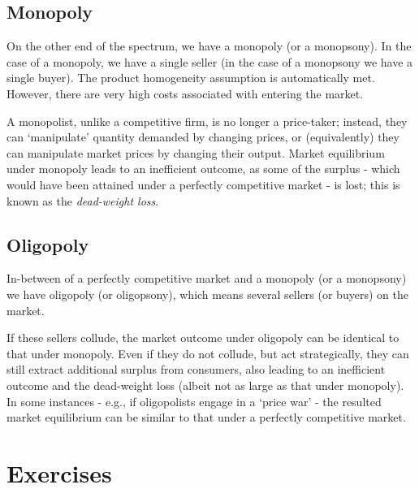 \documentclass[
  oneside]{book}
\begin{document}
\hypertarget{monopoly}{%
\subsection{Monopoly}\label{monopoly}}

On the other end of the spectrum, we have a monopoly (or a monopsony). In the case of a monopoly, we have a single seller (in the case of a monopsony we have a single buyer). The product homogeneity assumption is automatically met. However, there are very high costs associated with entering the market.

A monopolist, unlike a competitive firm, is no longer a price-taker; instead, they can `manipulate' quantity demanded by changing prices, or (equivalently) they can manipulate market prices by changing their output. Market equilibrium under monopoly leads to an inefficient outcome, as some of the surplus - which would have been attained under a perfectly competitive market - is lost; this is known as the \emph{dead-weight loss}.

\hypertarget{oligopoly}{%
\subsection{Oligopoly}\label{oligopoly}}

In-between of a perfectly competitive market and a monopoly (or a monopsony) we have oligopoly (or oligopsony), which means several sellers (or buyers) on the market.

If these sellers collude, the market outcome under oligopoly can be identical to that under monopoly. Even if they do not collude, but act strategically, they can still extract additional surplus from consumers, also leading to an inefficient outcome and the dead-weight loss (albeit not as large as that under monopoly). In some instances - e.g., if oligopolists engage in a `price war' - the resulted market equilibrium can be similar to that under a perfectly competitive market.

\hypertarget{exercises-1}{%
\section*{Exercises}\label{exercises-1}}
\end{document}
